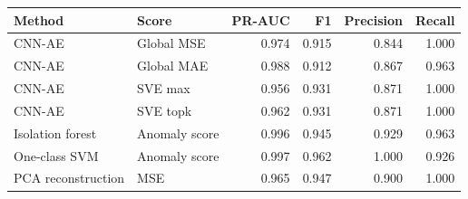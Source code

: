 \begin{tabular}{llrrrr}
\toprule
Method & Score & PR-AUC & F1 & Precision & Recall \\
\midrule
CNN-AE & Global MSE & 0.974 & 0.915 & 0.844 & 1.000 \\
CNN-AE & Global MAE & 0.988 & 0.912 & 0.867 & 0.963 \\
CNN-AE & SVE max & 0.956 & 0.931 & 0.871 & 1.000 \\
CNN-AE & SVE topk & 0.962 & 0.931 & 0.871 & 1.000 \\
Isolation forest & Anomaly score & 0.996 & 0.945 & 0.929 & 0.963 \\
One-class SVM & Anomaly score & 0.997 & 0.962 & 1.000 & 0.926 \\
PCA reconstruction & MSE & 0.965 & 0.947 & 0.900 & 1.000 \\
\bottomrule
\end{tabular}
